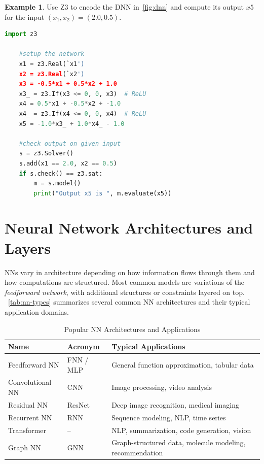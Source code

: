 \documentclass[oneside,11pt,dvipsnames]{book}
\numberwithin{equation}{section}
\theoremstyle{definition}
\newtheorem{example}{Example}[section]
\theoremstyle{remark}
\begin{document}
\begin{example}\label{ex:z3-dnn}
Use Z3 to encode the DNN in~\autoref{fig:dnn} and compute its output $x5$ for the input $(x_1, x_2) = (2.0, 0.5)$.

\begin{lstlisting}[language=python]
    import z3

    #setup the network
    x1 = z3.Real(`x1')
    x2 = z3.Real(`x2')
    x3 = -0.5*x1 + 0.5*x2 + 1.0    
    x3_ = z3.If(x3 <= 0, 0, x3)  # ReLU
    x4 = 0.5*x1 + -0.5*x2 + -1.0
    x4_ = z3.If(x4 <= 0, 0, x4)  # ReLU
    x5 = -1.0*x3_ + 1.0*x4_ - 1.0
    
    #check output on given input
    s = z3.Solver()
    s.add(x1 == 2.0, x2 == 0.5)
    if s.check() == z3.sat:
        m = s.model()
        print("Output x5 is ", m.evaluate(x5))
\end{lstlisting} 
\end{example}

\section{Neural Network Architectures and Layers}

NNs vary in architecture depending on how information flows through them and how computations are structured. Most common models are variations of the \emph{feedforward network}, with additional structures or constraints layered on top. ~\autoref{tab:nn-types} summarizes several common NN architectures and their typical application domains.


\begin{table}[ht]
\caption{Popular NN Architectures and Applications}\label{tab:nn-types}
\centering
\small
\begin{tabular}{llp{8cm}@{}}
\toprule
\textbf{Name} & \textbf{Acronym} & \textbf{Typical Applications} \\
\midrule
Feedforward NN & FNN / MLP & General function approximation, tabular data \\
Convolutional NN & CNN & Image processing, video analysis \\
Residual NN & ResNet & Deep image recognition, medical imaging \\
Recurrent NN & RNN & Sequence modeling, NLP, time series \\
Transformer & -- & NLP, summarization, code generation, vision \\
Graph NN & GNN & Graph-structured data, molecule modeling, recommendation \\
\bottomrule
\end{tabular}
\end{table}
\end{document}

